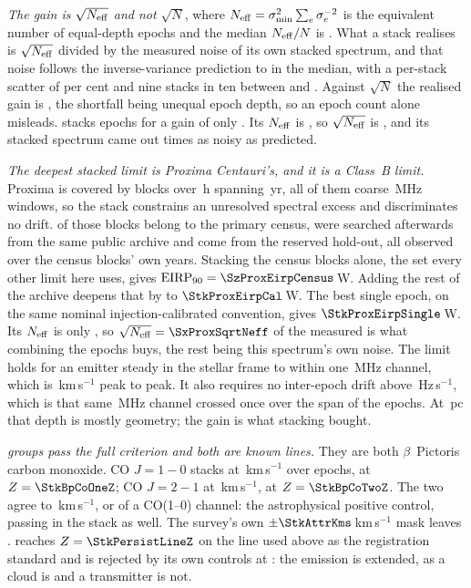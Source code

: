 \emph{The gain is $\sqrt{N_{\rm eff}}$ and not $\sqrt{N}$}, where
$N_{\rm eff}=\sigma_{\min}^{2}\sum_e\sigma_e^{-2}$ is the equivalent number of
equal-depth epochs and the median $N_{\rm eff}/N$ is \StkNeffFrac. What a
stack realises is $\sqrt{N_{\rm eff}}$ divided by the measured noise of its
own stacked spectrum, and that noise follows the inverse-variance prediction
to \StkGainVsNeff{} in the median, with a per-stack scatter of
\StkMadZScatterPct{} per cent and nine stacks in ten between \SzNoiseLo{} and
\SzNoiseHi. Against $\sqrt{N}$ the realised gain is \StkGainVsN, the
shortfall being unequal epoch depth, so an epoch count alone misleads.
\StkWorstStar{} stacks \StkWorstN{} epochs for a gain of only
\StkWorstGain. Its $N_{\rm eff}$ is \StkWorstNeff, so
$\sqrt{N_{\rm eff}}$ is \SzWorstSqrtNeff, and its stacked spectrum came out
\SzWorstNoise{} times as noisy as predicted.

\emph{The deepest stacked limit is Proxima Centauri's, and it is a Class~B
limit.} Proxima is covered by \StkProxN{} blocks over \StkProxHours\,h
spanning \StkProxSpanYr\,yr, all of them coarse \ChanBModeMHz\,MHz windows,
so the stack constrains an unresolved spectral excess and discriminates no
drift. \SxProxEbCensus{} of those blocks belong to the primary census,
\SzProxEbSearched{} were searched afterwards from the same public archive and
\SzProxEbHold{} come from the reserved hold-out, all observed over the census
blocks' own years. Stacking the census blocks alone, the set every other limit here uses,
gives $\mathrm{EIRP}_{90}=\SzProxEirpCensus$\,W. Adding the rest of the
archive deepens that by \SzProxDeepen{} to $\StkProxEirpCal$\,W. The best
single epoch, on the same nominal injection-calibrated convention, gives
$\StkProxEirpSingle$\,W. Its $N_{\rm eff}$ is only \StkProxNeff, so
$\sqrt{N_{\rm eff}}=\SxProxSqrtNeff$ of the measured \StkProxGain{} is what
combining the epochs buys, the rest being this spectrum's own noise. The limit holds for an emitter steady in the stellar frame to within one
\ChanBModeMHz\,MHz channel, which is \StkProxTolKms\,km\,s$^{-1}$ peak to
peak. It also requires no inter-epoch drift above
\StkProxDriftHzS\,Hz\,s$^{-1}$, which is that same \ChanBModeMHz\,MHz channel
crossed once over the span of the epochs. At \StkProxDistPc\,pc that depth is mostly
geometry; the gain is what stacking bought.

\emph{\StkNSurvive{} groups pass the full criterion and both are known
lines.} They are both $\beta$~Pictoris carbon monoxide. CO $J=1\!-\!0$ stacks at
\StkBpCoOneOff\,km\,s$^{-1}$ over \StkBpCoOneN{} epochs, at
$Z=\StkBpCoOneZ$; CO $J=2\!-\!1$ at \StkBpCoTwoOff\,km\,s$^{-1}$, at
$Z=\StkBpCoTwoZ$. The two agree to \StkBpCrossKms\,km\,s$^{-1}$, or
\StkBpCrossChan{} of a CO(1--0) channel: the astrophysical positive control,
passing in the stack as well. The
survey's own $\pm\StkAttrKms$\,km\,s$^{-1}$ mask leaves
\StkUnattrClause. \StkPersistLineStar{} reaches
$Z=\StkPersistLineZ$ on the line used above as the registration standard and is
rejected by its own controls at \StkPersistLineCtrl: the emission is extended,
as a cloud is and a transmitter is not.

